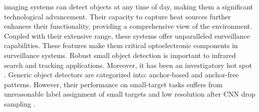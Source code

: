 \documentclass[journal]{IEEEtran}
\begin{document}
 imaging systems can detect objects at any time of day, making them a significant technological advancement. Their capacity to capture heat sources further enhances their functionality, providing a comprehensive view of the environment. Coupled with their extensive range, these systems offer unparalleled surveillance capabilities. These features make them critical optoelectronic components in surveillance systems\cite{dai2023one}. Robust small object detection is important to infrared search and tracking applications. Moreover, it has been an investigatory hot spot \cite{zhao2022single}. Generic object detectors are categorized into: anchor-based and anchor-free patterns. However, their performance on small-target tasks suffers from unreasonable label assignment of small targets and low resolution after CNN drop sampling
\cite{xu2022rfla}.

\end{document}
